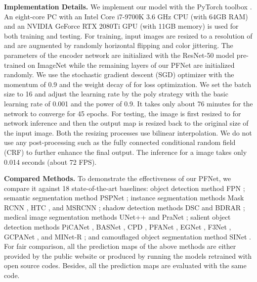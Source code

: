 \documentclass[final]{cvpr}
\begin{document}
\noindent \textbf{Implementation Details.} We implement our model with the PyTorch toolbox \cite{paszke2019pytorch}. An eight-core PC with an Intel Core i7-9700K 3.6 GHz CPU (with 64GB RAM) and an NVIDIA GeForce RTX 2080Ti GPU (with 11GB memory) is used for both training and testing. For training, input images are resized to a resolution of  and are augmented by randomly horizontal flipping and color jittering. The parameters of the encoder network are initialized with the ResNet-50 model \cite{he2016deep_resnet} pre-trained on ImageNet while the remaining layers of our PFNet are initialized randomly. We use the stochastic gradient descent (SGD) optimizer with the momentum of 0.9 and the weight decay of  for loss optimization. We set the batch size to 16 and adjust the learning rate by the poly strategy \cite{liu2015parsenet_poly} with the basic learning rate of 0.001 and the power of 0.9. It takes only about 76 minutes for the network to converge for 45 epochs. For testing, the image is first resized to  for network inference and then the output map is resized back to the original size of the input image. Both the resizing processes use bilinear interpolation. We do not use any post-processing such as the fully connected conditional random field (CRF) \cite{krahenbuhl2011efficient_crf} to further enhance the final output. The inference for a  image takes only 0.014 seconds (about 72 FPS).


\noindent \textbf{Compared Methods.} To demonstrate the effectiveness of our PFNet, we compare it against 18 state-of-the-art baselines: object detection method FPN \cite{lin2017feature_fpn}; semantic segmentation method PSPNet \cite{zhao2017pyramid_pspnet}; instance segmentation methods Mask RCNN \cite{he2017mask_maskrcnn}, HTC \cite{chen2019hybrid_htc}, and MSRCNN \cite{huang2019mask_msrcnn}; shadow detection methods DSC \cite{Hu_2018_CVPR_dsc} and BDRAR \cite{Zhu_2018_ECCV_bdrar}; medical image segmentation methods UNet++ \cite{zhou2018unet++} and PraNet \cite{fan2020pra_pranet}; salient object detection methods PiCANet \cite{liu2018picanet}, BASNet \cite{qin2019basnet}, CPD \cite{wu2019cascaded_cpd}, PFANet \cite{zhao2019pyramid_pfan}, EGNet \cite{zhao2019egnet}, F3Net \cite{wei2019f3net}, GCPANet \cite{chen2020global_gcpanet}, and MINet-R \cite{Pang_2020_CVPR_minet}; and camouflaged object segmentation method SINet \cite{Fan_2020_CVPR_sinet}. For fair comparison, all the prediction maps of the above methods are either provided by the public website or produced by running the models retrained with open source codes. Besides, all the prediction maps are evaluated with the same code.
\end{document}
